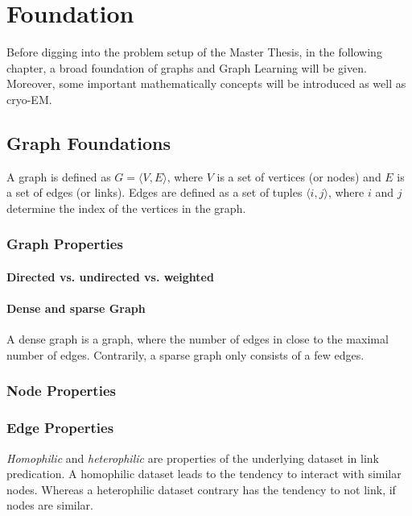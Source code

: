 \chapter{Foundation}
\label{sec:foundation}


Before digging into the problem setup of the Master Thesis, in the following chapter, a broad foundation
of graphs and Graph Learning will be given. Moreover, some important mathematically concepts will be introduced as well as cryo-EM.

\section{Graph Foundations}
A graph is defined as  $G = \langle V,E \rangle$, where $V$ is a set of 
vertices (or nodes) and $E$ is a set of edges (or links). Edges are 
defined as a set of tuples $\langle i,j \rangle$, where $i$ and $j$ determine the 
index of the vertices in the graph.

\subsection{Graph Properties}

\subsubsection{Directed vs. undirected vs. weighted}

\subsubsection{Dense and sparse Graph}
A dense graph is a graph, where the number of edges in close to the maximal number of edges.
Contrarily, a sparse graph only consists of a few edges.

\subsection{Node Properties}
\subsection{Edge Properties}
\textit{Homophilic} and \textit{heterophilic} are properties of the underlying dataset in link predication. 
A homophilic dataset leads to the tendency to interact with similar nodes. Whereas a heterophilic dataset contrary has the tendency to 
not link, if nodes are similar.


